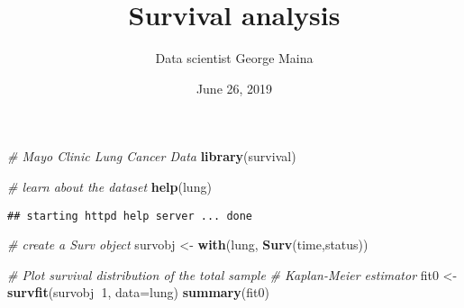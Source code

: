 \documentclass[]{article}
\title{Survival analysis}
\author{Data scientist George Maina}
\date{June 26, 2019}
\newenvironment{Shaded}{\begin{snugshade}}{\end{snugshade}}
\newcommand{\KeywordTok}[1]{\textcolor[rgb]{0.13,0.29,0.53}{\textbf{#1}}}
\newcommand{\DataTypeTok}[1]{\textcolor[rgb]{0.13,0.29,0.53}{#1}}
\newcommand{\DecValTok}[1]{\textcolor[rgb]{0.00,0.00,0.81}{#1}}
\newcommand{\StringTok}[1]{\textcolor[rgb]{0.31,0.60,0.02}{#1}}
\newcommand{\CommentTok}[1]{\textcolor[rgb]{0.56,0.35,0.01}{\textit{#1}}}
\newcommand{\OperatorTok}[1]{\textcolor[rgb]{0.81,0.36,0.00}{\textbf{#1}}}
\newcommand{\NormalTok}[1]{#1}
\begin{document}
\maketitle

\begin{Shaded}
\begin{Highlighting}[]
\CommentTok{# Mayo Clinic Lung Cancer Data}
\KeywordTok{library}\NormalTok{(survival)}

\CommentTok{# learn about the dataset}
\KeywordTok{help}\NormalTok{(lung)}
\end{Highlighting}
\end{Shaded}

\begin{verbatim}
## starting httpd help server ... done
\end{verbatim}

\begin{Shaded}
\begin{Highlighting}[]
\CommentTok{# create a Surv object}
\NormalTok{survobj <-}\StringTok{ }\KeywordTok{with}\NormalTok{(lung, }\KeywordTok{Surv}\NormalTok{(time,status))}

\CommentTok{# Plot survival distribution of the total sample}
\CommentTok{# Kaplan-Meier estimator}
\NormalTok{fit0 <-}\StringTok{ }\KeywordTok{survfit}\NormalTok{(survobj}\OperatorTok{~}\DecValTok{1}\NormalTok{, }\DataTypeTok{data=}\NormalTok{lung)}
\KeywordTok{summary}\NormalTok{(fit0)}
\end{Highlighting}
\end{Shaded}
\end{document}
